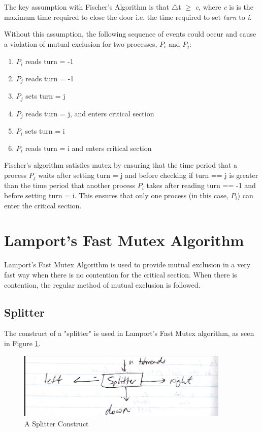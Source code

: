 \documentclass[twoside]{article}
\begin{document}
The key assumption with Fischer's Algorithm is that $\bigtriangleup$t $\ge$ \textit{c}, where \textit{c} is is the maximum time required to close the door i.e. the time required to set \textit{turn} to \textit{i}.

Without this assumption, the following sequence of events could occur and cause a violation of mutual exclusion for two processes, ${P_i}$ and ${P_j}$:
\begin{enumerate}
  \item ${P_i}$ reads turn = -1
  \item ${P_j}$ reads turn = -1
  \item ${P_j}$ sets turn = j
  \item ${P_j}$ reads turn = j, and enters critical section
  \item ${P_i}$ sets turn = i
  \item ${P_i}$ reads turn = i and enters critical section
\end{enumerate}

Fischer's algorithm satisfies mutex by ensuring that the time period that a process ${P_j}$ waits after setting turn = j and before checking if turn == j is greater than the time period that another process ${P_i}$ takes after reading turn == -1 and before setting turn = i. This ensures that only one process (in this case, ${P_i}$) can enter the critical section.

\section{Lamport's Fast Mutex Algorithm}

Lamport's Fast Mutex Algorithm is used to provide mutual exclusion in a very fast way when there is no contention for the critical section. When there is contention, the regular method of mutual exclusion is followed.

\subsection*{Splitter}

The construct of a "splitter" is used in Lamport's Fast Mutex algorithm, as seen in Figure \ref{fig:splitter}.

\begin{figure}
\centering
\includegraphics[width=0.9\textwidth]{Screenshot_20160918-185557.png}
\caption{\label{fig:splitter}A Splitter Construct}
\end{figure}
\end{document}
